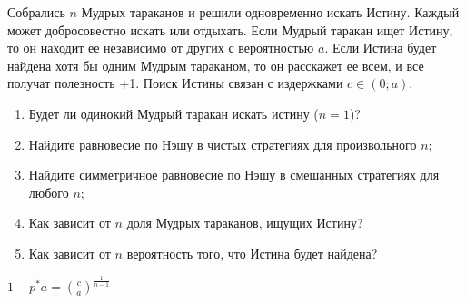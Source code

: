 \begin{problem}
Собрались $n$ Мудрых тараканов и решили одновременно искать Истину. Каждый может добросовестно искать или отдыхать. Если Мудрый таракан ищет Истину, то он находит ее независимо от других с вероятностью $a$. Если Истина будет найдена хотя бы одним Мудрым тараканом, то он расскажет ее всем, и все получат полезность +1. Поиск Истины связан с издержками $c\in(0;a)$. \par
\begin{enumerate}
\item Будет ли одинокий Мудрый таракан искать истину ($n=1$)? \par
\item Найдите равновесие по Нэшу в чистых стратегиях для произвольного $n$; \par
\item  Найдите симметричное равновесие по Нэшу в смешанных стратегиях для любого $n$; \par
\item Как зависит от $n$ доля Мудрых тараканов, ищущих Истину? \par
\item Как зависит от $n$ вероятность того, что Истина будет найдена?
\end{enumerate}


\begin{sol}

$1-p^{*}a=\left(\frac{c}{a}\right)^{\frac{1}{n-1}}$
\end{sol}
\end{problem}




